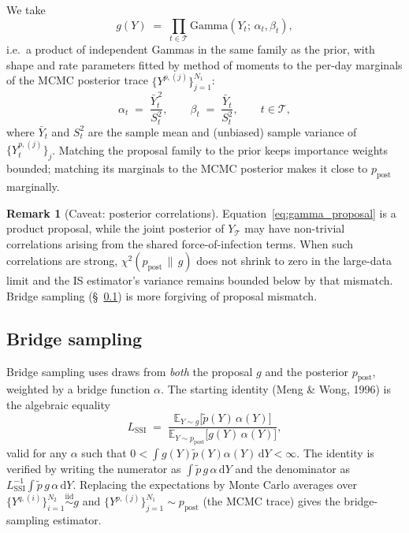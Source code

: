 \documentclass{article}
\theoremstyle{definition}
\newtheorem*{remark}{Remark}
\begin{document}
We take
\begin{equation}\label{eq:gamma_proposal}
  g(Y) \;=\; \prod_{t \in \mathcal T} \mathrm{Gamma}(Y_t;\, \alpha_t, \beta_t),
\end{equation}
i.e.\ a product of independent Gammas in the same family as the prior,
with shape and rate parameters fitted by method of moments to the
per-day marginals of the MCMC posterior trace
$\{Y^{p,(j)}\}_{j=1}^{N_1}$:
\begin{equation}\label{eq:mom_fit}
  \alpha_t \;=\; \frac{\bar Y_t^{\,2}}{S_t^2},
  \qquad
  \beta_t  \;=\; \frac{\bar Y_t}{S_t^2},
  \qquad t \in \mathcal T,
\end{equation}
where $\bar Y_t$ and $S_t^2$ are the sample mean and (unbiased) sample
variance of $\{Y_t^{p,(j)}\}_j$.  Matching the proposal family to the
prior keeps importance weights bounded; matching its marginals to the
MCMC posterior makes it close to $p_\mathrm{post}$ marginally.

\begin{remark}[Caveat: posterior correlations]
  Equation~\eqref{eq:gamma_proposal} is a product proposal, while the
  joint posterior of $Y_\mathcal T$ may have non-trivial correlations
  arising from the shared force-of-infection terms.  When such
  correlations are strong, $\chi^2(p_\mathrm{post} \,\|\, g)$ does not
  shrink to zero in the large-data limit and the IS estimator's variance
  remains bounded below by that mismatch.  Bridge sampling
  (\S~\ref{sec:bridge_evidence}) is more forgiving of proposal
  mismatch.
\end{remark}

\subsection{Bridge sampling}
\label{sec:bridge_evidence}

Bridge sampling uses draws from \emph{both} the proposal $g$ and the
posterior $p_\mathrm{post}$, weighted by a bridge function $\alpha$.
The starting identity (Meng \& Wong, 1996) is the algebraic equality
\begin{equation}\label{eq:bridge_identity}
  L_\mathrm{SSI}
  \;=\;
  \frac{\mathbb E_{Y \sim g}\!\bigl[\tilde p(Y)\, \alpha(Y)\bigr]}
  {\mathbb E_{Y \sim p_\mathrm{post}}\!\bigl[g(Y)\, \alpha(Y)\bigr]},
\end{equation}
valid for any $\alpha$ such that
$0 < \int g(Y) \tilde p(Y) \alpha(Y)\, \mathrm{d}Y < \infty$.  The
identity is verified by writing the numerator as
$\int \tilde p\, g\, \alpha\, \mathrm{d}Y$ and the denominator as
$L_\mathrm{SSI}^{-1} \int \tilde p\, g\, \alpha\, \mathrm{d}Y$.  Replacing
the expectations by Monte Carlo averages over
$\{Y^{q,(i)}\}_{i=1}^{N_2} \stackrel{\mathrm{iid}}{\sim} g$ and
$\{Y^{p,(j)}\}_{j=1}^{N_1} \sim p_\mathrm{post}$ (the MCMC trace) gives
the bridge-sampling estimator.
\end{document}
